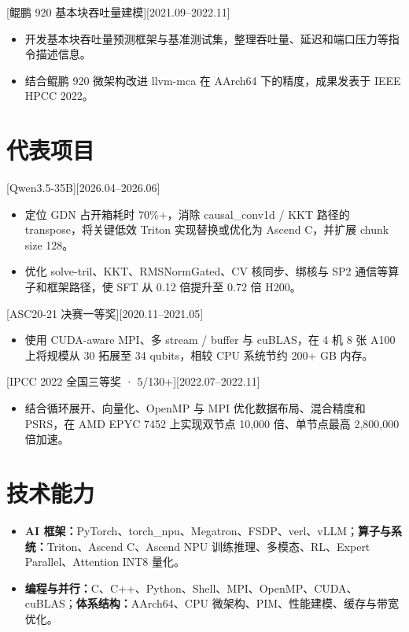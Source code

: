 \documentclass{resume}
\begin{document}
[鲲鹏 920 基本块吞吐量建模][2021.09--2022.11]
\begin{itemize}
  \item 开发基本块吞吐量预测框架与基准测试集，整理吞吐量、延迟和端口压力等指令描述信息。
  \item 结合鲲鹏 920 微架构改进 llvm-mca 在 AArch64 下的精度，成果发表于 IEEE HPCC 2022。
\end{itemize}

\section{代表项目}
[Qwen3.5-35B][2026.04--2026.06]
\begin{itemize}
  \item 定位 GDN 占开箱耗时 70\%+，消除 causal\_conv1d / KKT 路径的 transpose，将关键低效 Triton 实现替换或优化为 Ascend C，并扩展 chunk size 128。
  \item 优化 solve-tril、KKT、RMSNormGated、CV 核同步、绑核与 SP2 通信等算子和框架路径，使 SFT 从 0.12 倍提升至 0.72 倍 H200。
\end{itemize}

[ASC20-21 决赛一等奖][2020.11--2021.05]
\begin{itemize}
  \item 使用 CUDA-aware MPI、多 stream / buffer 与 cuBLAS，在 4 机 8 张 A100 上将规模从 30 拓展至 34 qubits，相较 CPU 系统节约 200+ GB 内存。
\end{itemize}

[IPCC 2022 全国三等奖 · 5/130+][2022.07--2022.11]
\begin{itemize}
  \item 结合循环展开、向量化、OpenMP 与 MPI 优化数据布局、混合精度和 PSRS，在 AMD EPYC 7452 上实现双节点 10,000 倍、单节点最高 2,800,000 倍加速。
\end{itemize}

\section{技术能力}
\begin{itemize}
  \item \textbf{AI 框架：}PyTorch、torch\_npu、Megatron、FSDP、verl、vLLM；\textbf{算子与系统：}Triton、Ascend C、Ascend NPU 训练推理、多模态、RL、Expert Parallel、Attention INT8 量化。
  \item \textbf{编程与并行：}C、C++、Python、Shell、MPI、OpenMP、CUDA、cuBLAS；\textbf{体系结构：}AArch64、CPU 微架构、PIM、性能建模、缓存与带宽优化。
\end{itemize}
\end{document}
